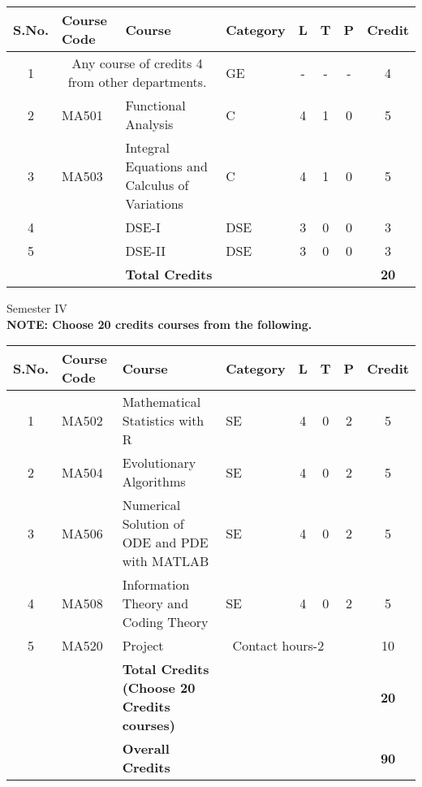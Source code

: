 \begin{center}
\begin{tabular}{|c |p{0.7in}| p{3in}|p{0.7in}|c|c|c|c|}
\hline
S.No.   & Course Code   & Course & Category         & L & T & P & Credit\\
          \hline
1 & \multicolumn{2}{c}{Any course of credits 4 from other departments.}  & GE      & - & - & - &4\\
                \hline
2       & MA501 &Functional Analysis & C  & 4 & 1 & 0 &5\\
                \hline
3       & MA503 & Integral Equations and Calculus of Variations & C   & 4 &1 &0&5\\
                                                                \hline
4       &  & DSE-I & DSE & 3&0& 0 &3\\
\hline
5       &  & DSE-II & DSE & 3&0& 0 &3\\
%
\hline
&  &\textbf{Total Credits} & & &  & &\textbf{20}\\
\hline
\end{tabular}

{\Large Semester IV}\\
\textbf{NOTE: Choose 20 credits courses from the following.}
\begin{tabular}{|c |p{0.7in}| p{3in}|p{0.7in}|c|c|c|c|}
                \hline
S.No.   & Course Code   & Course & Category         & L & T & P & Credit\\
                \hline
1 &MA502  &  Mathematical Statistics with R & SE     & 4 & 0 & 2 &5\\
                \hline
2       & MA504 & Evolutionary Algorithms & SE     & 4 & 0& 2 &5\\
								\hline
3 &  MA506  & Numerical Solution of ODE and PDE with MATLAB & SE      & 4 & 0 & 2 &5\\
                \hline
4       & MA508 & Information Theory and Coding Theory& SE   & 4 &0 &2&5\\
                \hline
5       &MA520  & Project & \multicolumn{3}{c}{Contact hours-2} & ~&10\\
\hline
&  &\textbf{Total Credits (Choose 20 Credits courses)} & & & & &\textbf{20}\\
\hline
\rowcolor{Gray}
\hline
&  &\textbf{Overall Credits} &&&&&\textbf{90}\\
\hline
\end{tabular}
\end{center}

